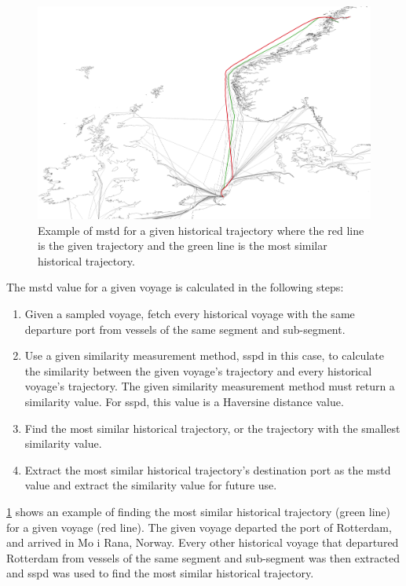 \begin{figure}[htbp]  %
    \centering
    \includegraphics[width=1.0\textwidth]{figures/mstd}
    \caption{Example of \acrshort{mstd} for a given historical trajectory where the red line is the given trajectory and the green line is the most similar historical trajectory.}
    \label{fig:mstd}
\end{figure}

The \acrshort{mstd} value for a given voyage is calculated in the following steps:

\begin{enumerate}
    \item Given a sampled voyage, fetch every historical voyage with the same departure port from vessels of the same segment and sub-segment.
    \item Use a given similarity measurement method, \acrshort{sspd} in this case, to calculate the similarity between the given voyage's trajectory and every historical voyage's trajectory. The given similarity measurement method must return a similarity value. For \acrshort{sspd}, this value is a Haversine distance value.
    \item Find the most similar historical trajectory, or the trajectory with the smallest similarity value.
    \item Extract the most similar historical trajectory's destination port as the \acrshort{mstd} value and extract the similarity value for future use.
\end{enumerate}

\cref{fig:mstd} shows an example of finding the most similar historical trajectory (green line) for a given voyage (red line). The given voyage departed the port of Rotterdam, and arrived in Mo i Rana, Norway. Every other historical voyage that departured Rotterdam from vessels of the same segment and sub-segment was then extracted and \acrshort{sspd} was used to find the most similar historical trajectory.

